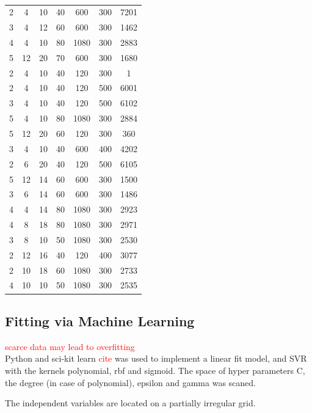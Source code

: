 \documentclass[a4paper]{article}
\newcommand{\td}[1]{\textcolor{red}{#1}}
\begin{document}
\begin{table}[htb]
\begin{tabular}{ccccccc}
2	&4	&10	&40	&600	&300	&7201	\\
3	&4	&12	&60	&600	&300	&1462	\\
4	&4	&10	&80	&1080	&300	&2883	\\
5	&12	&20	&70	&600	&300	&1680	\\
		\hline
2	&4	&10	&40	&120	&300	&1	\\
2	&4	&10	&40	&120	&500	&6001	\\
3	&4	&10	&40	&120	&500	&6102	\\
5	&4	&10	&80	&1080	&300	&2884	\\
5	&12	&20	&60	&120	&300	&360	\\
		\hline
3	&4	&10	&40	&600	&400	&4202	\\
2	&6	&20	&40	&120	&500	&6105	\\
5	&12	&14	&60	&600	&300	&1500	\\
3	&6	&14	&60	&600	&300	&1486	\\
4	&4	&14	&80	&1080	&300	&2923	\\
		\hline
4	&8	&18	&80	&1080	&300	&2971	\\
3	&8	&10	&50	&1080	&300	&2530	\\
2	&12	&16	&40	&120	&400	&3077	\\
2	&10	&18	&60	&1080	&300	&2733	\\
4	&10	&10	&50	&1080	&300	&2535	\\
		\hline
		\hline
	\end{tabular}
	\caption{}
	\label{tab:emma}
\end{table}



\subsection{Fitting via Machine Learning}
\td{scarce data may lead to overfitting\cite{Lecun1995conv}}\\
Python and sci-kit learn \td{cite} was used to implement a linear fit model, and SVR with the kernels polynomial, rbf and sigmoid. 
The space of hyper parameters C, the degree (in case of polynomial), epsilon and gamma was scaned. 

The independent variables are located on a partially irregular grid.  


\clearpage
\end{document}
